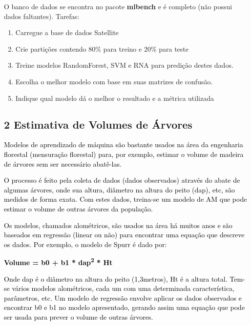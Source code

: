 O banco de dados se encontra no pacote \textbf{mlbench} e é completo (não possui dados faltantes).
\newpage
Tarefas:

\begin{enumerate}[series=listWWNumxxii,label=\arabic*.,ref=\arabic*]
\item Carregue a base de dados Satellite
\item Crie partições contendo 80\% para treino e 20\% para teste
\item Treine modelos RandomForest, SVM e RNA para predição destes dados. 
\item Escolha o melhor modelo com base em suas matrizes de confusão. 
\item Indique qual modelo dá o melhor o resultado e a métrica utilizada
\end{enumerate}




\subsection*{\textbf{2 Estimativa de Volumes de Árvores}}



\textcolor{black}{Modelos de aprendizado de máquina são bastante usados na área da engenharia florestal (mensuração
florestal) para, por exemplo, estimar o volume de madeira de árvores sem ser necessário abatê-las.}

\textcolor{black}{O processo é feito pela coleta de dados (dados observados) através do abate de algumas árvores, onde
sua altura, diâmetro na altura do peito (dap), etc, são medidos de forma exata. Com estes dados, treina-se um modelo de
AM que pode estimar o volume de outras árvores da população.}

\textcolor{black}{Os modelos, chamados alométricos, são usados na área há muitos anos e são baseados em regressão
(linear ou não) para encontrar uma equação que descreve os dados. Por exemplo, o modelo de Spurr é dado por:}



{\centering
\textbf{\textcolor{black}{Volume = b0 + b1 *
dap}}\textbf{\textcolor{black}{\textsuperscript{2}}}\textbf{\textcolor{black}{ * Ht}}
\par}



\textcolor{black}{Onde dap é o diâmetro na altura do peito (1,3metros), Ht é a altura total. Tem-se vários modelos
alométricos, cada um com uma determinada característica, parâmetros, etc. Um modelo de regressão envolve aplicar os
dados observados e encontrar b0 e b1 no modelo apresentado, gerando assim uma equação que pode ser usada para prever o
volume de outras árvores.}

